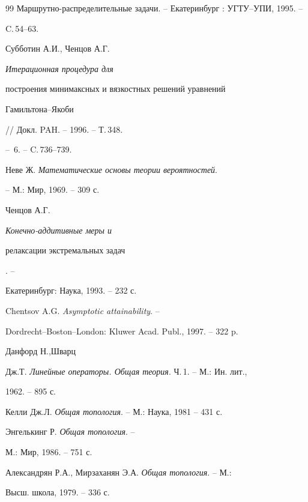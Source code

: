 \begin{thebibliography}{99}
Маршрутно-распределительные задачи. -- Екатеринбург : УГТУ--УПИ, 1995. --


C.\,54--63.





 Субботин А.И., Ченцов А.Г. {\em Итерационная процедура для


построения минимаксных и вязкостных решений уравнений


Гамильтона--Якоби} // Докл. PAH. -- 1996. -- Т.\,348.


-- \No\,6. -- C.\,736--739.





 Неве Ж. {\em Математические основы теории вероятностей}.


-- М.: Мир, 1969. -- 309 с.





 Ченцов А.Г. {\em Конечно-аддитивные меры и


релаксации экстремальных задач}. --


Екатеринбург: Наука, 1993. -- 232 с.





 Chentsov A.G. {\em Asymptotic attainability}. --


Dordrecht--Boston--London: Kluwer Acad. Publ., 1997. -- 322 p.





 Данфорд Н.,Шварц


Дж.Т. {\em Линейные операторы. Общая теория}. Ч.\,1. -- М.: Ин. лит.,


1962. -- 895 с.





 Келли Дж.Л. {\em Общая топология}. -- М.: Наука, 1981 -- 431 с.





 Энгелькинг Р. {\em Общая топология}. --


М.: Мир, 1986. -- 751 с.





 Александрян Р.А., Мирзаханян Э.А. {\em Общая топология}. -- М.:


Высш. школа, 1979. -- 336 с.






\end{thebibliography}
